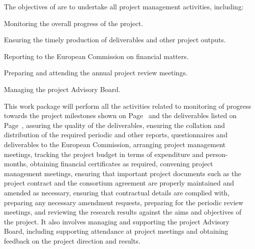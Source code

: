 \addtocounter{wpno}{1}

\begin{Workpackage}{\thewpno}
\WPTitle{\wpname{\thewpno}}


\begin{WPObjectives}
The objectives of \theWP{} are to undertake all project management activities, including:
\begin{compactitem}
\item
Monitoring the overall progress of the project.
\item
Ensuring the timely production of deliverables and other project outputs.
\item
Reporting to the European Commission on financial matters.
\item
Preparing and attending the annual project review meetings.

\item
Managing the project Advisory Board.
\end{compactitem}
\end{WPObjectives}

\begin{WPDescription}
This work package will perform all the activities related to monitoring
of progress towards the project milestones shown on Page~\pageref{sect:milestones}
and the deliverables listed on Page~\pageref{sect:deliverables},
assuring the quality of the deliverables, ensuring the
collation and distribution of the required periodic and other reports,
questionnaires and deliverables to
the European Commission, arranging project management meetings, tracking
the project budget in terms of expenditure and person-months,
obtaining financial certificates as required, convening project
management meetings, ensuring that important project documents
such as the project contract and the consortium agreement are
properly maintained and amended as necessary, ensuring that
contractual details are complied with, preparing any necessary amendment requests,
preparing for the periodic review meetings, and reviewing the research
results against the aims and objectives of the project.
It also involves managing and supporting the project
Advisory Board, including supporting attendance at project
meetings and obtaining feedback on the project direction and
results.
\end{WPDescription}


\end{Workpackage}

